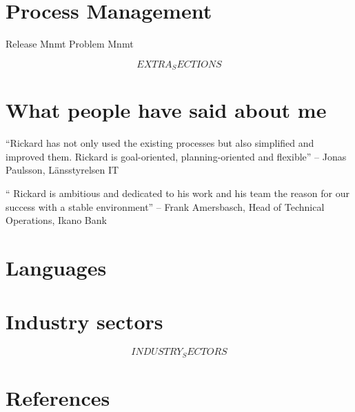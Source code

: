 \documentclass[11pt,a4paper,sans]{moderncv}
\begin{document}

\section{Process Management}
 {Release Mnmt}
 {Problem Mnmt}

$$EXTRA_SECTIONS$$



\section{What people have said about me}

\begin{quotelist}
\item  ``Rickard has not only used the existing processes but also simplified and improved them.
        Rickard is goal-oriented, planning-oriented and flexible''  -- Jonas Paulsson, Länsstyrelsen IT
\item
        `` Rickard is ambitious and dedicated to his work and his team the reason for our success with a stable environment''  -- Frank Amersbasch, Head of Technical Operations, Ikano Bank
  \end{quotelist}

\section{Languages}

\section{Industry sectors}
$$INDUSTRY_SECTORS$$

\section{References}

\nocite{*}

\clearpage
\Large
\end{document}
